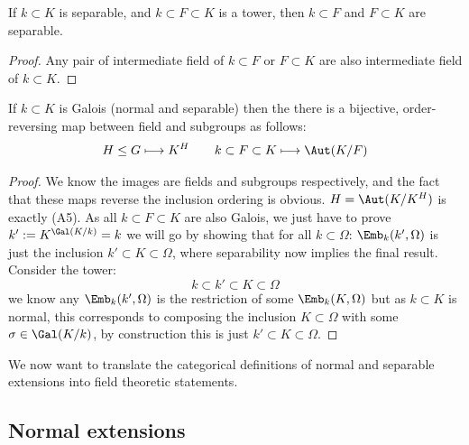 \documentclass{article}
\begin{document}
\begin{lemma}
    If $k\subset K$ is separable, and $k\subset F \subset K$ is a tower, then $k\subset F$ and $F\subset K$ are separable.
    \begin{proof}
        Any pair of intermediate field of $k\subset F$ or $F\subset K$ are also intermediate field of $k\subset K$.
    \end{proof}
\end{lemma}

\begin{theorem}
    If $k\subset K$ is Galois (normal and separable) then the there is a bijective, order-reversing map between field and subgroups as follows: \[
        H\leq G \longmapsto K^H \qquad k\subset F \subset K \longmapsto \Aut(K/F)
    \]\begin{proof}
        We know the images are fields and subgroups respectively, and the fact that these maps reverse the inclusion ordering is obvious. $H = \Aut(K/K^H)$ is exactly (A5). As all $k\subset F\subset K$ are also Galois, we just have to prove $k':=K^{\Gal(K/k)} = k$ we will go by showing that for all $k\subset \Omega$: $\Emb_k(k',\Omega)$ is just the inclusion $k'\subset K \subset \Omega$, where separability now implies the final result. Consider the tower: \[
            k\subset k' \subset K \subset \Omega
        \] we know any $\Emb_k(k',\Omega)$ is the restriction of some $\Emb_k(K,\Omega)$ but as $k\subset K$ is normal, this corresponds to composing the inclusion $K\subset \Omega$ with some $\sigma\in \Gal(K/k)$, by construction this is just $k'\subset K\subset \Omega$.
    \end{proof}
\end{theorem}

We now want to translate the categorical definitions of normal and separable extensions into field theoretic statements.

\subsection{Normal extensions}
\end{document}
